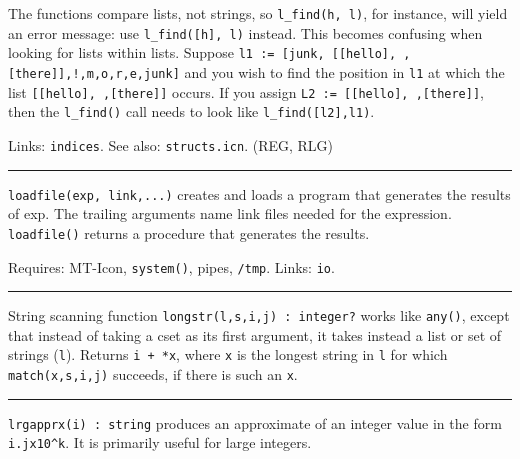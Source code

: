 The functions compare lists, not strings, so
\texttt{l\_find({\textquotedbl}h{\textquotedbl}, l)}, for instance,
will yield an error message: use
\texttt{l\_find([{\textquotedbl}h{\textquotedbl}], l)} instead. This
becomes confusing when looking for lists within lists. Suppose
\texttt{l1 := [{\textquotedbl}junk{\textquotedbl},
[[{\textquotedbl}hello{\textquotedbl}],{\textquotedbl}
{\textquotedbl},[{\textquotedbl}there{\textquotedbl}]],{\textquotedbl}!{\textquotedbl},{\textquotedbl}m{\textquotedbl},{\textquotedbl}o{\textquotedbl},{\textquotedbl}r{\textquotedbl},{\textquotedbl}e{\textquotedbl},{\textquotedbl}junk{\textquotedbl}]}
and you wish to find the position in \texttt{l1} at which the list
\texttt{[[{\textquotedbl}hello{\textquotedbl}],{\textquotedbl}
{\textquotedbl},[{\textquotedbl}there{\textquotedbl}]]} occurs. If you
assign \texttt{L2 :=
[[{\textquotedbl}hello{\textquotedbl}],{\textquotedbl}
{\textquotedbl},[{\textquotedbl}there{\textquotedbl}]]}, then the
\texttt{l\_find()} call needs to look like \texttt{l\_find([l2],l1)}.

Links: \texttt{indices}. See also: \texttt{structs.icn}. (REG, RLG)

\vspace{0.25cm}\hrule{}

\texttt{loadfile(exp, link,...)} creates and loads a program that
generates the results of exp. The trailing arguments name link files
needed for the expression. \texttt{loadfile()} returns a procedure that
generates the results.

Requires: MT-Icon, \texttt{system()}, pipes, \texttt{/tmp}. Links:
\texttt{io}. 

\vspace{0.25cm}\hrule{}

String scanning function \texttt{longstr(l,s,i,j) : integer?} works like
\texttt{any()}, except that instead of taking a cset as its first
argument, it takes instead a list or set of strings (\texttt{l}).
Returns \texttt{i + *x}, where \texttt{x} is the longest string in \texttt{l} for which \texttt{match(x,s,i,j)}
succeeds, if there is such an \texttt{x}.

\vspace{0.25cm}\hrule{}

\texttt{lrgapprx(i) : string} produces an approximate of an integer
value in the form \texttt{i.jx10\^{}k}. It is primarily useful for
large integers. 

